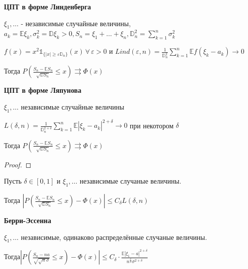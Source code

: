 \begin{theorem}
    \textbf{ЦПТ в форме Линденберга}

    $\xi_1, \ldots$ - независимые случайные величины, $a_k = \mathbb{E} \xi_k, \sigma_k^2 = \mathbb{D} \xi_k > 0, S_n = \xi_1 + \ldots + \xi_n, \mathbb{D}_n^2 = \sum_{k = 1}^n \sigma_k^2$

    $f(x) = x^2 \mathds{1}_{\{ |x| \geqslant \varepsilon \mathbb{D}_n \} } (x) \, \forall \, \varepsilon > 0$ и $Lind (\varepsilon, n) = \frac{1}{\mathbb{D}_n^2} \sum_{k = 1}^n \mathbb{E} f (\xi_k - a_k) \rightarrow 0$   
    
    Тогда $P \left( \frac{S_n - \mathbb{E} S_n}{\sqrt{\mathbb{D} S_n}} \leqslant x \right) \rightrightarrows \Phi (x)$
\end{theorem}

\begin{theorem}
    \textbf{ЦПТ в форме Ляпунова}

    $\xi_1, \ldots$ независимые случайные величины

    $L(\delta, n) = \frac{1}{\mathbb{D}_n^{2 + \delta}} \sum_{k = 1}^n \mathbb{E} | \xi_k - a_k |^{2 + \delta} \rightarrow 0$ при некотором $\delta$
    
    Тогда $P\left( \frac{S_n - \mathbb{E} S_n}{\sqrt{\mathbb{D} S_n}} \leqslant x \right) \rightrightarrows \Phi (x)$
\end{theorem}

\begin{proof}
\end{proof}

\begin{theorem}
    Пусть $\delta \in [0, 1]$ и $\xi_1, \ldots$ независимые случаные величины.

    Тогда $\left | P \left( \frac{S_n - \mathbb{E} S_n}{\sqrt{\mathbb{D} S_n}} \leqslant x \right) - \Phi (x) \right | \leqslant C_{\delta} L (\delta, n)$
\end{theorem}

\begin{theorem}
    \textbf{Берри-Эссенна}

    $\xi_1, \ldots$ независимые, одинаково распределённые случаные величины.    

    Тогда$\left | P \left( \frac{S_n - na}{\sqrt{\sqrt{n} \sigma}} \leqslant x \right) - \Phi (x) \right | \leqslant C_{\delta} \cdot \frac{\mathbb{E} |\xi_1 - a|^{2 + \delta}}{n^{\frac{\delta}{2}} \sigma^{2 + \delta}}$
\end{theorem}

